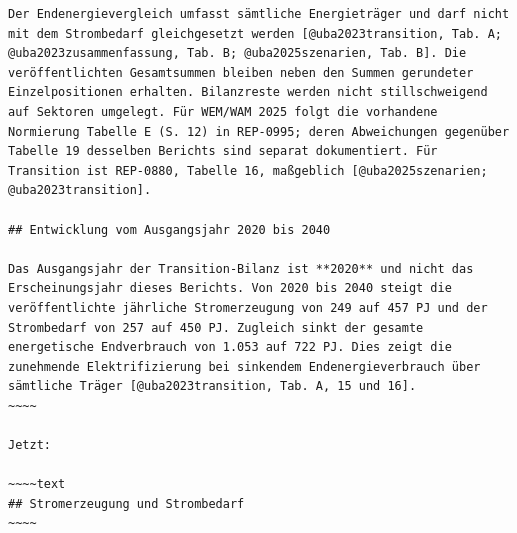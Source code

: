 \documentclass[
  ngerman,
  a4paper,
  DIV=11]{scrreprt}
\begin{document}
\begin{verbatim}
Der Endenergievergleich umfasst sämtliche Energieträger und darf nicht mit dem Strombedarf gleichgesetzt werden [@uba2023transition, Tab. A; @uba2023zusammenfassung, Tab. B; @uba2025szenarien, Tab. B]. Die veröffentlichten Gesamtsummen bleiben neben den Summen gerundeter Einzelpositionen erhalten. Bilanzreste werden nicht stillschweigend auf Sektoren umgelegt. Für WEM/WAM 2025 folgt die vorhandene Normierung Tabelle E (S. 12) in REP-0995; deren Abweichungen gegenüber Tabelle 19 desselben Berichts sind separat dokumentiert. Für Transition ist REP-0880, Tabelle 16, maßgeblich [@uba2025szenarien; @uba2023transition].

## Entwicklung vom Ausgangsjahr 2020 bis 2040

Das Ausgangsjahr der Transition-Bilanz ist **2020** und nicht das Erscheinungsjahr dieses Berichts. Von 2020 bis 2040 steigt die veröffentlichte jährliche Stromerzeugung von 249 auf 457 PJ und der Strombedarf von 257 auf 450 PJ. Zugleich sinkt der gesamte energetische Endverbrauch von 1.053 auf 722 PJ. Dies zeigt die zunehmende Elektrifizierung bei sinkendem Endenergieverbrauch über sämtliche Träger [@uba2023transition, Tab. A, 15 und 16].
~~~~

Jetzt:

~~~~text
## Stromerzeugung und Strombedarf
~~~~
\end{verbatim}
\end{document}
